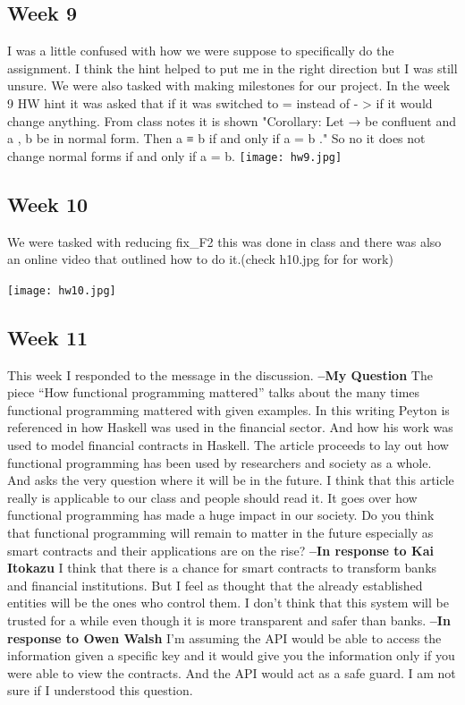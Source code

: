 \documentclass{article}
\theoremstyle{theorem}
\theoremstyle{definition}
\theoremstyle{remark}
\begin{document}
\subsection{Week 9}
    I was a little confused with how we were suppose to specifically do the assignment. I think the hint helped to put me in the right direction but I was still unsure. We were also tasked with making milestones for our project. In the week 9 HW hint it was asked that if it was switched to = instead of - > if it would change anything. From class notes it is shown "Corollary: Let → be confluent and a , b be in normal form. Then a ≡ b if and only if a = b ." So no it does not change  normal forms if and only if a = b. 
     \texttt{[image: hw9.jpg]}
     
\subsection{Week 10}
    We were tasked with reducing fix_F2 this was done in class and there was also an online video that outlined how to do it.(check h10.jpg for for work)

\texttt{[image: hw10.jpg]}

\subsection{Week 11}
This week I responded to the message in the discussion.
\textbf{--My Question}\newline
The piece “How functional programming mattered” talks about the many times functional programming mattered with given examples. In this writing Peyton is referenced in how Haskell was used in the financial sector. And how his work was used to model financial contracts in Haskell. The article proceeds to lay out how functional programming has been used by researchers and society as a whole. And asks the very question where it will be in the future. I think that this article really is applicable to our class and people should read it. It goes over how functional programming has made a huge impact in our society. Do you think that functional programming will remain to matter in the future especially as smart contracts and their applications are on the rise?
\newline
\textbf{--In response to Kai Itokazu}
I think that there is a chance for smart contracts to transform banks and financial institutions. But I feel as thought that the already established entities will be the ones who control them. I don't think that this system will be trusted for a while even though it is more transparent and safer than banks.
\newline
\textbf{--In response to  Owen Walsh}
I'm assuming the API would be able to access the information given a specific key and it would give you the information only if you were able to view the contracts. And the API would act as a safe guard. I am not sure if I understood this question.
\end{document}
